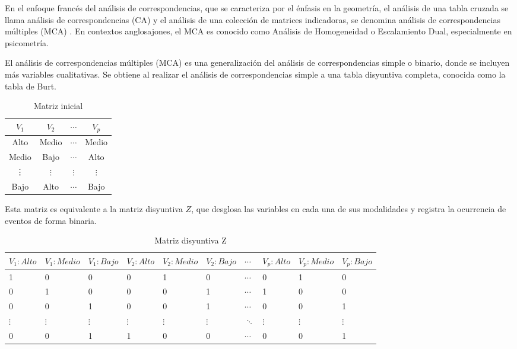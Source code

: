 \documentclass[mathematics,article,submit,moreauthors,pdftex]{mdpi}
\begin{document}
En el enfoque francés del análisis de correspondencias, que se
caracteriza por el énfasis en la geometría, el análisis de una tabla
cruzada se llama análisis de correspondencias (CA) y el análisis de una
colección de matrices indicadoras, se denomina análisis de
correspondencias múltiples (MCA) \citep{michailidis1998}. En contextos
anglosajones, el MCA es conocido como Análisis de Homogeneidad o
Escalamiento Dual, especialmente en psicometría.

El análisis de correspondencias múltiples (MCA) es una generalización
del análisis de correspondencias simple o binario, donde se incluyen más
variables cualitativas. Se obtiene al realizar el análisis de
correspondencias simple a una tabla disyuntiva completa, conocida como
la tabla de Burt.

\begin{table}[!ht]
\begin{center}
 \begin{tabular}{||c c c c||} 
 \hline
 $V_{1}$ & $V_{2}$ & $\cdots$ & $V_{p}$ \\ [0.5ex] 
 \hline\hline
 Alto & Medio & $\cdots$ & Medio\\
 \hline
Medio & Bajo & $\cdots$ & Alto\\
\hline
\vdots & $\vdots$ & $\vdots$ & $\vdots$\\
\hline
Bajo & Alto & $\cdots$ & Bajo \\ [1ex] 
 \hline
\end{tabular}\caption{Matriz inicial}
\label{tab:inicial}
\end{center}
\end{table}

Esta matriz es equivalente a la matriz disyuntiva \(Z\), que desglosa
las variables en cada una de sus modalidades y registra la ocurrencia de
eventos de forma binaria.

\begin{table}[!ht]
\begin{center}
 \begin{tabular}{||p{1cm}p{1cm}p{1cm}||p{1cm}p{1cm} p{1cm} ||p{1cm} ||p{1cm} p{1cm} p{1cm} ||} 
 \hline
 $V_{1}:Alto$ &$V_{1}:Medio$ &$V_{1}:Bajo$ & $V_{2}:Alto$ & $V_{2}:Medio$ & $V_{2}:Bajo$ & $\cdots$ & $V_{p}:Alto$ & $V_{p}:Medio$ & $V_{p}:Bajo$ \\ [0.5ex] 
 \hline\hline
 1 & 0 & 0 & 0 & 1 & 0 & $\cdots$ & 0 & 1 & 0 \\ [0.2ex] 
 \hline
 0 & 1 & 0 & 0 & 0 & 1 & $\cdots$ & 1 & 0 & 0 \\ 
\hline
 0 & 0 & 1 & 0 & 0 &  1 & $\cdots$ & 0 & 0 & 1 \\ 
\hline
 $\vdots$ & $\vdots$ & $\vdots$ & $\vdots$ & $\vdots$ &  $\vdots$ & $\ddots$ & $\vdots$ & $\vdots$ & $\vdots$ \\ 
\hline
 0 & 0 & 1 & 1 & 0 & 0 & $\cdots$ & 0 & 0 & 1 \\  
 \hline
\end{tabular}
\caption{Matriz disyuntiva Z}
\label{tab:z}
\end{center}
\end{table}
\end{document}
